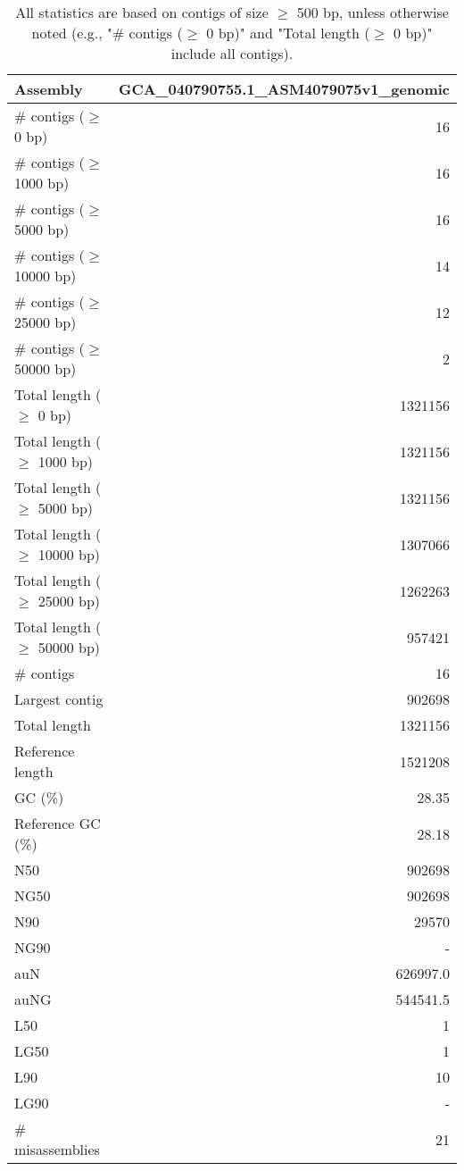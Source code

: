 \documentclass[12pt,a4paper]{article}
\begin{document}
\begin{table}[ht]
\begin{center}
\caption{All statistics are based on contigs of size $\geq$ 500 bp, unless otherwise noted (e.g., "\# contigs ($\geq$ 0 bp)" and "Total length ($\geq$ 0 bp)" include all contigs).}
\begin{tabular}{|l*{1}{|r}|}
\hline
Assembly & GCA\_040790755.1\_ASM4079075v1\_genomic \\ \hline
\# contigs ($\geq$ 0 bp) & 16 \\ \hline
\# contigs ($\geq$ 1000 bp) & 16 \\ \hline
\# contigs ($\geq$ 5000 bp) & 16 \\ \hline
\# contigs ($\geq$ 10000 bp) & 14 \\ \hline
\# contigs ($\geq$ 25000 bp) & 12 \\ \hline
\# contigs ($\geq$ 50000 bp) & 2 \\ \hline
Total length ($\geq$ 0 bp) & 1321156 \\ \hline
Total length ($\geq$ 1000 bp) & 1321156 \\ \hline
Total length ($\geq$ 5000 bp) & 1321156 \\ \hline
Total length ($\geq$ 10000 bp) & 1307066 \\ \hline
Total length ($\geq$ 25000 bp) & 1262263 \\ \hline
Total length ($\geq$ 50000 bp) & 957421 \\ \hline
\# contigs & 16 \\ \hline
Largest contig & 902698 \\ \hline
Total length & 1321156 \\ \hline
Reference length & 1521208 \\ \hline
GC (\%) & 28.35 \\ \hline
Reference GC (\%) & 28.18 \\ \hline
N50 & 902698 \\ \hline
NG50 & 902698 \\ \hline
N90 & 29570 \\ \hline
NG90 & - \\ \hline
auN & 626997.0 \\ \hline
auNG & 544541.5 \\ \hline
L50 & 1 \\ \hline
LG50 & 1 \\ \hline
L90 & 10 \\ \hline
LG90 & - \\ \hline
\# misassemblies & 21 \\ \hline

\end{tabular}
\end{center}
\end{table}
\end{document}

